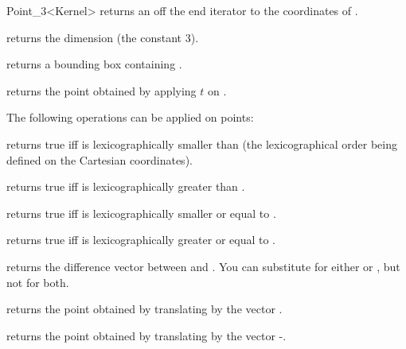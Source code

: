 \begin{ccRefClass} {Point_3<Kernel>}
       {returns an off the end iterator to the  
        coordinates of \ccVar.}

       {returns the dimension (the constant 3).}

       {returns a bounding box containing \ccVar.}

       {returns the point obtained by applying $t$ on \ccVar.}


The following operations can be applied on points:

       {returns true iff  is lexicographically smaller than 
       (the lexicographical order being defined on the Cartesian
       coordinates).}

       {returns true iff  is lexicographically greater than .}

       {returns true iff  is lexicographically smaller or equal to
.}

       {returns true iff  is lexicographically greater or equal to
.}

       {returns the difference vector between  and . 
        You can substitute  for either  or , 
        but not for both.}

       {returns the point obtained by translating  by the 
        vector .}

       {returns the point obtained by translating  by the 
        vector -.}

\ccSeeAlso


\end{ccRefClass} 

